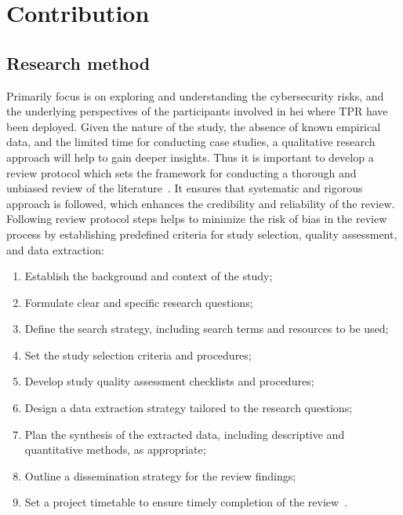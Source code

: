 
\newpage


\section{Contribution}\label{sec:contribution}


\subsection{Research method}\label{subsec:research-method}

Primarily focus is on exploring and understanding the cybersecurity risks, and the underlying perspectives of the participants
involved in \ac{hei} where \ac{TPR} have been deployed. Given
the nature of the study, the absence of known empirical data, and the limited time for conducting case studies, a qualitative research
approach
will help to gain deeper insights. Thus it is important to develop a review protocol which sets the framework for conducting a thorough and
unbiased review of the literature~\cite[8]{systematic_review_2004}. It ensures that
systematic and rigorous approach is followed, which enhances the credibility and reliability of the review. Following review protocol steps
helps
to minimize the risk of bias in the review process by establishing predefined criteria for study selection, quality assessment, and data
extraction:

\begin{enumerate}
  \item Establish the background and context of the study;
  \item Formulate clear and specific research questions;
  \item Define the search strategy, including search terms and resources to be used;
  \item Set the study selection criteria and procedures;
  \item Develop study quality assessment checklists and procedures;
  \item Design a data extraction strategy tailored to the research questions;
  \item Plan the synthesis of the extracted data, including descriptive and quantitative methods, as appropriate;
  \item Outline a dissemination strategy for the review findings;
  \item Set a project timetable to ensure timely completion of the review~\cite[4-5]{systematic_review_2004}.
\end{enumerate}

